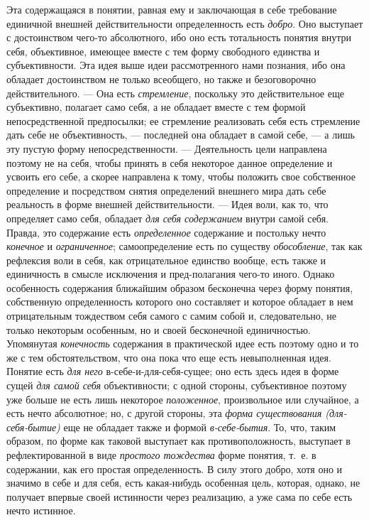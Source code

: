 \documentclass[twoside]{article}
\begin{document}
Эта содержащаяся в понятии, равная ему и заключающая в себе
требование единичной внешней действительности определенность
есть {\em добро}.
Оно выступает с достоинством чего-то абсолютного, ибо оно
есть тотальность понятия внутри себя, объективное, имеющее вместе с тем
форму свободного единства и субъективности. Эта идея выше идеи
рассмотренного нами познания, ибо она обладает достоинством не только
всеобщего, но также и безоговорочно действительного. — Она
есть {\em стремление},
поскольку это действительное еще субъективно, полагает само
себя, а не обладает вместе с тем формой непосредственной предпосылки; ее
стремление реализовать себя есть стремление дать себе не объективность, —
последней она обладает в самой себе, — а лишь
эту пустую форму непосредственности. — Деятельность цели
направлена поэтому не на себя, чтобы принять в себя некоторое данное
определение и усвоить его себе, а скорее направлена к тому, чтобы положить
свое собственное определение и посредством снятия определений внешнего мира
дать себе реальность в форме внешней действительности. —
Идея воли, как то, что определяет само себя, обладает
{\em для себя содержанием}
внутри самой себя. Правда, это содержание есть
{\em определенное}
содержание и постольку нечто
{\em конечное} и
{\em ограниченное};
самоопределение есть по существу
{\em обособление}, так
как рефлексия воли в себя, как отрицательное единство вообще, есть также и
единичность в смысле исключения и пред-полагания чего-то
иного. Однако особенность содержания ближайшим образом бесконечна через
форму понятия, собственную определенность которого оно составляет и которое
обладает в нем отрицательным тождеством себя самого с самим собой и,
следовательно, не только некоторым особенным, но и своей бесконечной
единичностью. Упомянутая
{\em конечность}
содержания в практической идее есть поэтому одно и то же с
тем обстоятельством, что она пока что еще есть невыполненная идея. Понятие
есть {\em для него}
в-себе-и-для-себя-сущее; оно есть здесь идея в форме сущей
{\em для самой себя}
объективности; с одной стороны, субъективное поэтому уже
больше не есть лишь некоторое
{\em положенное},
произвольное или случайное, а есть нечто абсолютное; но, с
другой стороны, эта {\em форма
существования (для-себя-бытие)} еще не обладает также и
формой {\em в-себе-бытия}.
То, что, таким образом, по форме как таковой выступает как
противоположность, выступает в рефлектированной в виде
{\em простого тождества}
форме понятия, т.~е. в содержании, как его простая
определенность. В силу этого добро, хотя оно и значимо в себе и для себя,
есть какая-нибудь особенная цель, которая, однако, не получает впервые
своей истинности через реализацию, а уже сама по себе есть нечто
истинное.
\end{document}
